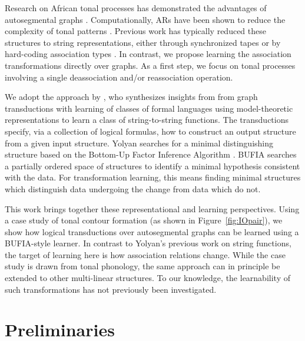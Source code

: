 \documentclass[pmlr]{jmlr}%
\begin{document}
	Research on African tonal 
	processes has demonstrated the advantages of autosegmental graphs 
	\citep{CG1984autosegmental, odden2013introducing,hyman2009representation}.  
	Computationally, ARs have been shown to 
	reduce the complexity of tonal patterns \citep{jardine2016computationally, Chandlee-jardine2021input}.
	Previous work has typically reduced these structures to string 
	representations, either through synchronized tapes or by hard-coding association types \citep{wiebe1992modelling,bird1994one,yli2013finite,yli2015three,rawski2020multi}.
	In contrast, we propose learning the association transformations directly over graphs.
	As a first step, we focus on tonal processes involving a single deassociation and/or reassociation operation.
	
	We adopt the approach by \citet{yolyan2025logical, yolyan2025phonological}, who synthesizes insights from from graph transductions \citep{Courcelle1994, EngelfrietHoogeboom2001,
		CourcelleEngelfriet2012} with learning of classes of formal languages using model-theoretic representations \citep{Strother-Garcia-HeinzEtAl-2016-UMTGICSP, Vu+2018, chandleeBufia2019} to learn a class of string-to-string functions.
	The transductions specify, via a collection of logical formulas, how to construct an output structure from a given input structure.
	Yolyan searches for a minimal distinguishing structure based on the Bottom-Up Factor Inference Algorithm 
	\citep[BUFIA;][]{chandleeBufia2019, rawski2021structure, li2025learning, Swanson+2025, LiHeinzPhO2026}. 
	BUFIA searches a partially ordered space of structures to 
	identify a minimal hypothesis consistent with the data.
	For transformation learning, this means finding minimal structures which distinguish data undergoing the change from data which do not.
	
	This work brings together these representational and learning
	perspectives. Using a case study of tonal contour formation (as shown
	in Figure~\ref{fig:IOpair}), we show how logical transductions over
	autosegmental graphs can be learned using a BUFIA-style learner. In
	contrast to Yolyan's previous work on string functions, the target of
	learning here is how association relations change.  While the case
	study is drawn from tonal phonology, the same approach can in
	principle be extended to other multi-linear structures.  To our
	knowledge, the learnability of such transformations has not previously
	been investigated.
	
	\section{Preliminaries}
	
\end{document}

